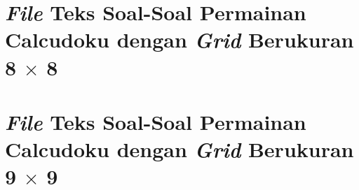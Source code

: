 















\clearpage

\section{\textit{File} Teks Soal-Soal Permainan Calcudoku dengan \textit{Grid} Berukuran 8 $\times$ 8}
\label{sec:soalsoal8x8}















\clearpage

\section{\textit{File} Teks Soal-Soal Permainan Calcudoku dengan \textit{Grid} Berukuran 9 $\times$ 9}
\label{sec:soalsoal9x9}




